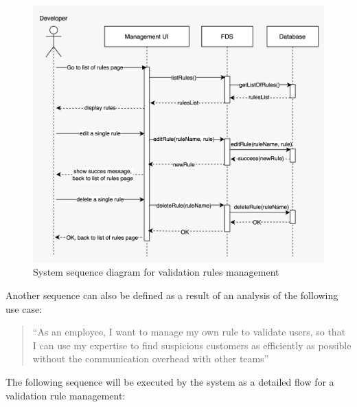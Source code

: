 \begin{figure}[!ht]
 \includegraphics[width=\textwidth]{diagrams/sequence_management.jpeg}
 \caption{System sequence diagram for validation rules management}
\end{figure}


Another sequence can also be defined as a result of an analysis of the following use case:

\begin{quotation}
 \enquote{As an employee, I want to manage my own rule to validate users, so that I can use my expertise to find suspicious customers as efficiently as possible without the communication overhead with other teams} 
\end{quotation}

The following sequence will be executed by the system as a detailed flow for a validation rule management:

